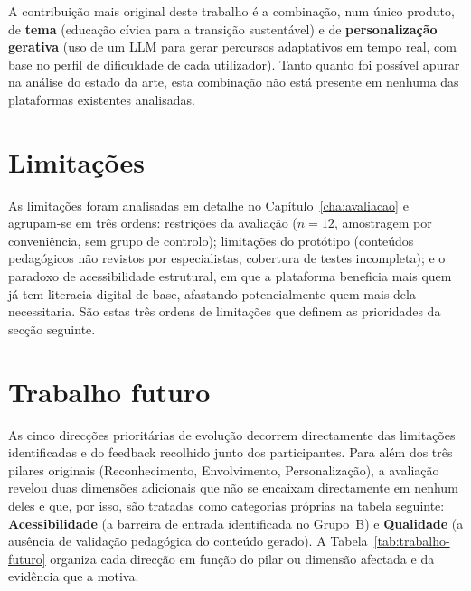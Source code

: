 A contribuição mais original deste trabalho é a combinação, num único produto, de \textbf{tema} (educação cívica para a transição sustentável) e de \textbf{personalização gerativa} (uso de um LLM para gerar percursos adaptativos em tempo real, com base no perfil de dificuldade de cada utilizador). Tanto quanto foi possível apurar na análise do estado da arte, esta combinação não está presente em nenhuma das plataformas existentes analisadas.

\section{Limitações}
\label{sec:limitacoes}

As limitações foram analisadas em detalhe no Capítulo~\ref{cha:avaliacao} e agrupam-se em três ordens: restrições da avaliação ($n=12$, amostragem por conveniência, sem grupo de controlo); limitações do protótipo (conteúdos pedagógicos não revistos por especialistas, cobertura de testes incompleta); e o paradoxo de acessibilidade estrutural, em que a plataforma beneficia mais quem já tem literacia digital de base, afastando potencialmente quem mais dela necessitaria. São estas três ordens de limitações que definem as prioridades da secção seguinte.

\section{Trabalho futuro}
\label{sec:trabalho-futuro}

As cinco direcções prioritárias de evolução decorrem directamente das limitações identificadas e do feedback recolhido junto dos participantes. Para além dos três pilares originais (Reconhecimento, Envolvimento, Personalização), a avaliação revelou duas dimensões adicionais que não se encaixam directamente em nenhum deles e que, por isso, são tratadas como categorias próprias na tabela seguinte: \textbf{Acessibilidade} (a barreira de entrada identificada no Grupo~B) e \textbf{Qualidade} (a ausência de validação pedagógica do conteúdo gerado). A Tabela~\ref{tab:trabalho-futuro} organiza cada direcção em função do pilar ou dimensão afectada e da evidência que a motiva.

